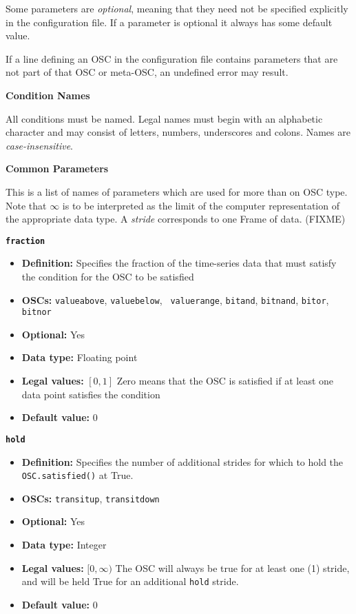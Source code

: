 {Some parameters are \textit{optional}, meaning that they need not be
specified explicitly in the configuration file.  If a parameter is
optional it always has some default value.

If a line defining an OSC in the configuration file contains
parameters that are not part of that OSC or meta-OSC, an undefined
error may result.

\begin{center}
  \textbf{{\large Condition Names}}
\end{center}

All conditions must be named.  Legal names must begin with an alphabetic 
character and may consist of letters, numbers, underscores and colons.  
Names are \textit{case-insensitive}.

\begin{center}
  \textbf{Common Parameters}
\end{center}

This is a list of names of parameters which are used for more than on
OSC type.  Note that $\infty$ is to be interpreted as the limit of the
computer representation of the appropriate data type.  A \textit{stride}
corresponds to one Frame of data. (FIXME)

{\large\texttt{\textbf{fraction}}}
\begin{itemize}
\item \textbf{Definition:} Specifies the fraction of the time-series data
  that  must satisfy the condition for the OSC to be satisfied
\item \textbf{OSCs:} \texttt{valueabove}, \texttt{valuebelow}, \texttt{
    valuerange}, \texttt{bitand}, \texttt{bitnand}, \texttt{bitor}, \texttt{
    bitnor} 
\item \textbf{Optional:} Yes
\item \textbf{Data type:} Floating point  
\item \textbf{Legal values:} $[0, 1]$ Zero means that the OSC is
  satisfied if at least one data point satisfies the condition
\item \textbf{Default value:} $0$
\end{itemize}

{\large\texttt{\textbf{hold}}}
\begin{itemize}
\item \textbf{Definition:} Specifies the number of additional strides for
  which to hold the \texttt{OSC.satisfied()} at True.
\item \textbf{OSCs:} \texttt{transitup}, \texttt{transitdown}
\item \textbf{Optional:} Yes
\item \textbf{Data type:} Integer
\item \textbf{Legal values:} $[0, \infty)$ The OSC will always be true
  for at least one (1) stride, and will be held True for an
  additional \texttt{hold} stride.
\item \textbf{Default value:} $0$
\end{itemize}

}
